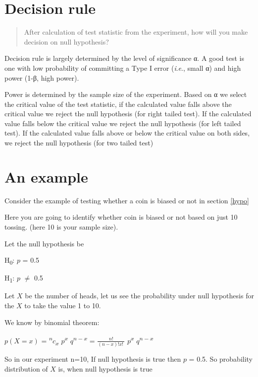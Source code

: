 \documentclass[
]{book}
\begin{document}
\hypertarget{decision-rule}{%
\section{Decision rule}\label{decision-rule}}

\begin{quote}
After calculation of test statistic from the experiment, how will you make decision on null hypothesis?
\end{quote}

Decision rule is largely determined by the level of significance α. A good test is one with low probability of committing a Type I error (\emph{i}.\emph{e}., small α) and high power (1-β, high power).

Power is determined by the sample size of the experiment. Based on α we select the critical value of the test statistic, if the calculated value falls above the critical value we reject the null hypothesis (for right tailed test). If the calculated value falls below the critical value we
reject the null hypothesis (for left tailed test). If the calculated value falls above or below the critical value on both sides, we reject the null hypothesis (for two tailed test)

\hypertarget{an-example}{%
\section{An example}\label{an-example}}

Consider the example of testing whether a coin is biased or not in section \ref{hypo}

Here you are going to identify whether coin is biased or not based on just 10 tossing. (here 10 is your sample size).

Let the null hypothesis be

H\textsubscript{0}: \(p\) = 0.5

H\textsubscript{1}: \(p\) \(\neq\) 0.5

Let \(X\) be the number of heads, let us see the probability under null hypothesis for the \(X\) to take the value 1 to 10.

We know by binomial theorem:

\(p(X=x)\) = \textsuperscript{\(n\)}\(c\)\textsubscript{\(x\)} \(p\)\textsuperscript{\(x\)} \(q\)\textsuperscript{\(n-x\)} = \(\frac{n!}{\left( n - x \right)!x!\ }\) \(p\)\textsuperscript{\(x\)} \(q\)\textsuperscript{\(n-x\)}

So in our experiment n=10, If null hypothesis is true then \(p\) = 0.5. So probability distribution of \(X\) is, when null hypothesis is true
\end{document}
